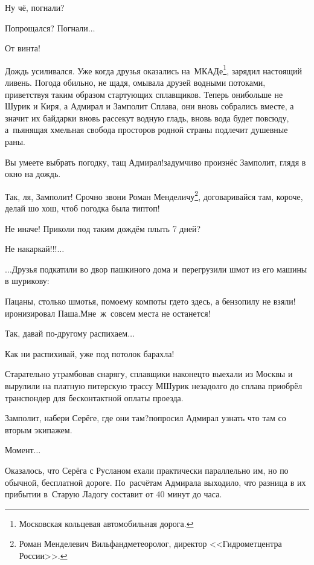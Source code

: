 \diagdash Ну чё, погнали?

\diagdash Попрощался? Погнали$\ldots$

\diagdash От винта!

\renewcommand*{\thefootnote}{\arabic{footnote}}

Дождь усиливался. Уже когда друзья оказались на~МКАДе\footnote{Московская кольцевая автомобильная дорога.}, зарядил настоящий ливень. Погода обильно, не щадя, омывала друзей водными потоками, приветствуя таким образом стартующих сплавщиков. Теперь они\mdash больше не Шурик и Киря, а Адмирал и Замполит Сплава, они вновь собрались вместе, а значит их байдарки вновь рассекут водную гладь, вновь вода будет повсюду, а~пьянящая хмельная свобода просторов родной страны подлечит душевные раны.

\diagdash Вы умеете выбрать погодку, тащ Адмирал!\mdash задумчиво произнёс Замполит, глядя в окно на дождь.

\diagdash Так, ля, Замполит! Срочно звони Роман Менделичу\footnote{Роман Менделевич Вильфанд\mdash метеоролог, директор <<Гидрометцентра России>>.}, договаривайся там, короче, делай шо хош, чтоб погодка была тип\sdash топ!

\diagdash Не иначе! Приколи под таким дождём плыть 7 дней?

\diagdash Не накаркай!!!$\ldots$

\vspace{0.5cm}
$\ldots$Друзья подкатили во двор пашкиного дома и~перегрузили шмот из его машины в шурикову:

\diagdash Пацаны, столько шмотья, по\sdash моему компоты где\sdash то здесь, а бензопилу не взяли!\mdash иронизировал Паша.\mdash Мне~ж~совсем места не останется!

\diagdash Так, давай по-другому распихаем$\ldots$

\diagdash Как ни распихивай, уже под потолок барахла!

Старательно утрамбовав снарягу, сплавщики наконец\sdash то выехали из Москвы и вырулили на платную питерскую трассу М\mdash Шурик незадолго до сплава приобрёл транспондер для бесконтактной оплаты проезда.

\diagdash Замполит, набери Серёге, где они там?\mdash попросил Адмирал узнать что там со вторым экипажем.

\diagdash Момент$\ldots$

Оказалось, что Серёга с Русланом ехали практически параллельно им, но по обычной, бесплатной дороге. По~расчётам Адмирала выходило, что разница в их прибытии в~Старую Ладогу составит от 40 минут до часа.

